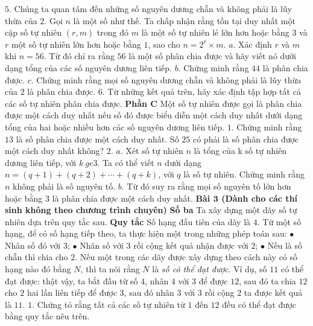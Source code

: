 \begin{multicols}{2}
	 \vskip 0.05cm
	$5.$ Chúng ta quan tâm đến những số nguyên dương chẵn và không phải là lũy thừa của $2$. Gọi $n$ là một số như thế. Ta chấp nhận rằng tồn tại duy nhất một cặp số tự nhiên $(r,m)$ trong đó $m$ là một số tự nhiên lẻ lớn hơn hoặc bằng $3$ và $r$ một số tự nhiên lớn hơn hoặc bằng $1$, sao cho  $n=2^r\times m$.
	\vskip 0.05cm
	$a.$ Xác định $r$ và $m$ khi $n=56$. Từ đó chỉ ra rằng $56$ là một số phân chia được và hãy viết nó dưới dạng tổng của các số nguyên dương liên tiếp.
	\vskip 0.05cm
	$b.$ Chứng minh rằng $44$ là phân chia được.
	\vskip 0.05cm
	$c.$ Chứng minh rằng mọi  số nguyên dương chẵn và không phải là lũy thừa của $2$ là phân chia được. 
	\vskip 0.05cm
	$6.$ Từ những kết quả trên, hãy xác định tập hợp tất cả các số tự nhiên phân chia được.
	\vskip 0.05cm
	\textbf{\color{cackithi}Phần C}
	\vskip 0.05cm
	Một số tự nhiên được gọi là phân chia được một cách duy nhất nếu số đó được biểu diễn một cách duy nhất dưới dạng tổng của hai hoặc nhiều hơn các số nguyên dương liên tiếp.
	\vskip 0.05cm
	$1.$ Chứng minh rằng $13$ là số phân chia được một cách duy nhất. Số $25$ có phải là số phân chia được một cách duy nhất không?
	\vskip 0.05cm
	$2.$ $a.$ Xét số tự nhiên $n$ là tổng của k số tự nhiên dương liên tiếp, với $k\ ge3$. Ta có thể viết $n$ dưới dạng  $n=(q+1)+(q+2)+\cdots+(q+k)$, với $q$ là số tự nhiên. Chứng minh rằng $n$ không phải là số nguyên tố.
	\vskip 0.05cm
	$b$. Từ đó suy ra rằng mọi số nguyên tố lớn hơn hoặc bằng $3$ là phân chia được một cách duy nhất.
	\vskip 0.05cm
	\textbf{\color{cackithi}Bài $\pmb{3}$ (Dành cho các thí sinh không theo chương trình chuyên)}
	\vskip 0.05cm
		\textbf{\color{cackithi}Số ba}
	\vskip 0.05cm
	Ta xây dựng một dãy số tự nhiên dựa trên quy tắc sau.
	\vskip 0.05cm
	\textbf{\color{cackithi}Quy tắc}
	\vskip 0.05cm
	Số hạng đầu tiên của dãy là $4$.
	\vskip 0.05cm
	Từ một số hạng, để có số hạng tiếp theo, ta thực hiện một trong những phép toán sau:
	\vskip 0.05cm 
	$\bullet$ Nhân số đó với $3$;
	\vskip 0.05cm
	$\bullet$ Nhân số với $3$ rồi cộng kết quả nhận được với $2$;
	\vskip 0.05cm
	$\bullet$ Nếu là số chẵn thì chia cho $2$.
	\vskip 0.05cm
	Nếu một trong các dãy được xây dựng theo cách này có số hạng nào đó bằng $N$, thì ta nói rằng $N$ là \textit{số có thể đạt được}.
	\vskip 0.05cm 
	Ví dụ, số $11$ có thể đạt được: thật vậy, ta bắt đầu từ số $4$, nhân $4$ với $3$ để được $12$, sau đó ta chia $12$ cho $2$ hai lần liên tiếp để được $3$, sau đó nhân $3$ với $3$ rồi cộng $2$ ta được kết quả là $11$.
	\vskip 0.05cm 
	$1.$ Chứng tỏ rằng tất cả các số tự nhiên từ $1$ đến $12$ đều có thể đạt được bằng quy tắc nêu trên. 

\end{multicols}
